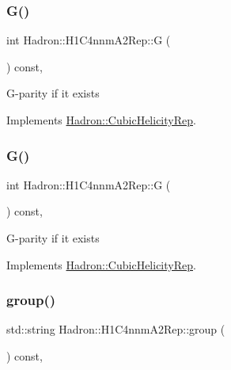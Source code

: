 \subsubsection{\texorpdfstring{G()}{G()}\hspace{0.1cm}{\footnotesize\ttfamily [1/2]}}
{\footnotesize\ttfamily int Hadron\+::\+H1\+C4nnm\+A2\+Rep\+::G (\begin{DoxyParamCaption}{ }\end{DoxyParamCaption}) const\hspace{0.3cm}{\ttfamily [inline]}, {\ttfamily [virtual]}}

G-\/parity if it exists 

Implements \mbox{\hyperlink{structHadron_1_1CubicHelicityRep_a50689f42be1e6170aa8cf6ad0597018b}{Hadron\+::\+Cubic\+Helicity\+Rep}}.

\mbox{\label{structHadron_1_1H1C4nnmA2Rep_a7d26d361c13d0d609075c46c0ea7bc10}} 
\subsubsection{\texorpdfstring{G()}{G()}\hspace{0.1cm}{\footnotesize\ttfamily [2/2]}}
{\footnotesize\ttfamily int Hadron\+::\+H1\+C4nnm\+A2\+Rep\+::G (\begin{DoxyParamCaption}{ }\end{DoxyParamCaption}) const\hspace{0.3cm}{\ttfamily [inline]}, {\ttfamily [virtual]}}

G-\/parity if it exists 

Implements \mbox{\hyperlink{structHadron_1_1CubicHelicityRep_a50689f42be1e6170aa8cf6ad0597018b}{Hadron\+::\+Cubic\+Helicity\+Rep}}.

\mbox{\label{structHadron_1_1H1C4nnmA2Rep_a618b727c856720ba9e2828e3485f6733}} 
\subsubsection{\texorpdfstring{group()}{group()}\hspace{0.1cm}{\footnotesize\ttfamily [1/3]}}
{\footnotesize\ttfamily std\+::string Hadron\+::\+H1\+C4nnm\+A2\+Rep\+::group (\begin{DoxyParamCaption}{ }\end{DoxyParamCaption}) const\hspace{0.3cm}{\ttfamily [inline]}, {\ttfamily [virtual]}}

